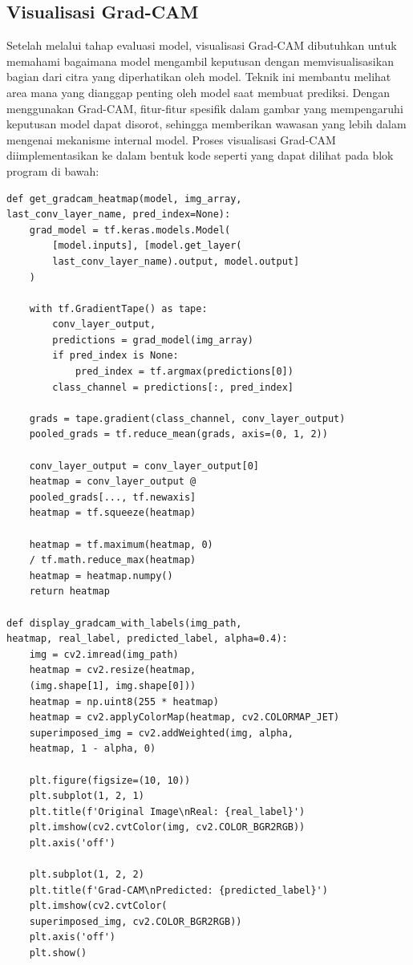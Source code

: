 \subsection{Visualisasi Grad-CAM}
Setelah melalui tahap evaluasi model, visualisasi Grad-CAM dibutuhkan untuk memahami bagaimana model mengambil keputusan dengan memvisualisasikan bagian dari citra yang diperhatikan oleh model. Teknik ini membantu melihat area mana yang dianggap penting oleh model saat membuat prediksi. Dengan menggunakan Grad-CAM, fitur-fitur spesifik dalam gambar yang mempengaruhi keputusan model dapat disorot, sehingga memberikan wawasan yang lebih dalam mengenai mekanisme internal model. Proses visualisasi Grad-CAM diimplementasikan ke dalam bentuk kode seperti yang dapat dilihat pada blok program di bawah:
\begin{lstlisting}[style=customc]
def get_gradcam_heatmap(model, img_array, 
last_conv_layer_name, pred_index=None):
    grad_model = tf.keras.models.Model(
        [model.inputs], [model.get_layer(
        last_conv_layer_name).output, model.output]
    )

    with tf.GradientTape() as tape:
        conv_layer_output, 
        predictions = grad_model(img_array)
        if pred_index is None:
            pred_index = tf.argmax(predictions[0])
        class_channel = predictions[:, pred_index]

    grads = tape.gradient(class_channel, conv_layer_output)
    pooled_grads = tf.reduce_mean(grads, axis=(0, 1, 2))

    conv_layer_output = conv_layer_output[0]
    heatmap = conv_layer_output @ 
    pooled_grads[..., tf.newaxis]
    heatmap = tf.squeeze(heatmap)

    heatmap = tf.maximum(heatmap, 0) 
    / tf.math.reduce_max(heatmap)
    heatmap = heatmap.numpy()
    return heatmap

def display_gradcam_with_labels(img_path, 
heatmap, real_label, predicted_label, alpha=0.4):
    img = cv2.imread(img_path)
    heatmap = cv2.resize(heatmap, 
    (img.shape[1], img.shape[0]))
    heatmap = np.uint8(255 * heatmap)
    heatmap = cv2.applyColorMap(heatmap, cv2.COLORMAP_JET)
    superimposed_img = cv2.addWeighted(img, alpha, 
    heatmap, 1 - alpha, 0)

    plt.figure(figsize=(10, 10))
    plt.subplot(1, 2, 1)
    plt.title(f'Original Image\nReal: {real_label}')
    plt.imshow(cv2.cvtColor(img, cv2.COLOR_BGR2RGB))
    plt.axis('off')

    plt.subplot(1, 2, 2)
    plt.title(f'Grad-CAM\nPredicted: {predicted_label}')
    plt.imshow(cv2.cvtColor(
    superimposed_img, cv2.COLOR_BGR2RGB))
    plt.axis('off')
    plt.show()
\end{lstlisting}

